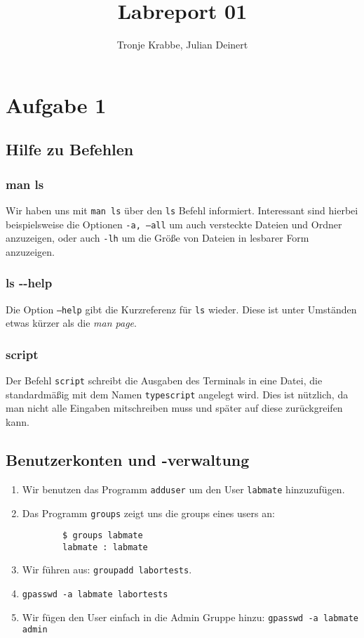 \documentclass[12pt,a4paper]{article}
\author{Tronje Krabbe, Julian Deinert}
\title{Labreport 01}
\begin{document}
\maketitle
\tableofcontents
\newpage


\section*{Aufgabe 1}
\subsection{Hilfe zu Befehlen}
\subsubsection{man ls}
Wir haben uns mit \texttt{man ls} über den \texttt{ls} Befehl informiert.
Interessant sind hierbei beispielsweise die Optionen \texttt{-a, ---all} um auch versteckte Dateien und Ordner anzuzeigen, oder auch \texttt{-lh} um die Größe von Dateien in lesbarer Form anzuzeigen.
\subsubsection{ls \--\--help}
Die Option \texttt{---help} gibt die Kurzreferenz für \texttt{ls} wieder. Diese ist unter Umständen etwas kürzer als die \textit{man page}.
\subsubsection{script}
Der Befehl \texttt{script} schreibt die Ausgaben des Terminals in eine Datei, die standardmäßig mit dem Namen \texttt{typescript} angelegt wird. Dies ist nützlich, da man nicht alle Eingaben mitschreiben muss und später auf diese zurückgreifen kann.
\subsection{Benutzerkonten und -verwaltung}
\begin{enumerate}
    \item Wir benutzen das Programm \texttt{adduser} um den User \texttt{labmate} hinzuzufügen.
    \item Das Programm \texttt{groups} zeigt uns die groups eines users an:
        \begin{verbatim}
        $ groups labmate
        labmate : labmate
        \end{verbatim}
    \item Wir führen aus: \texttt{groupadd labortests}.
    \item \texttt{gpasswd -a labmate labortests}
    \item Wir fügen den User einfach in die Admin Gruppe hinzu: \texttt{gpasswd -a labmate admin}
\end{enumerate}
\end{document}
